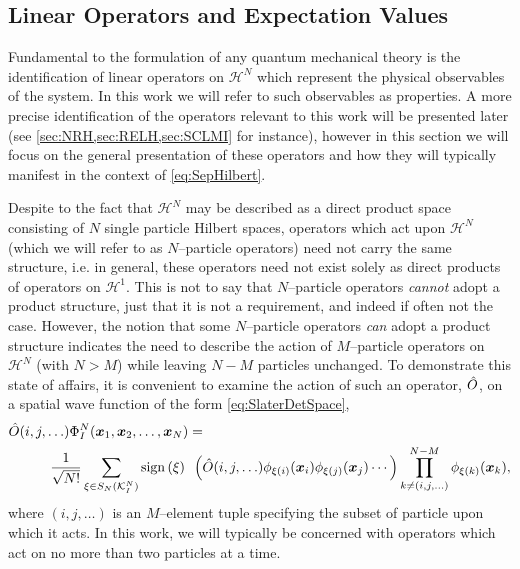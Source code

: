 \subsection{Linear Operators and Expectation Values}
\label{sec:LO}

Fundamental to the formulation of any quantum mechanical theory is the identification of linear operators on $\mathcal{H}^N$
which represent the physical observables of the system. In this work we will refer to such observables as properties. A
more precise identification of the operators relevant to this work will be presented later 
(see \cref{sec:NRH,sec:RELH,sec:SCLMI} for instance), however in this section we will focus on the general presentation
of these operators and how they will typically manifest in the context of \cref{eq:SepHilbert}. 

Despite to the fact that $\mathcal{H}^N$ may be described as a direct product space consisting of $N$ single particle
Hilbert spaces, operators which act upon $\mathcal{H}^N$ (which we will refer to as $N$--particle operators) need not carry the same structure, 
i.e. in general, these operators need not exist solely as direct products of operators on $\mathcal{H}^1$. This is not to say
that $N$--particle operators \emph{cannot} adopt a product structure, just that it is not a requirement, and indeed
if often not the case. However, the notion that some $N$--particle operators \emph{can} adopt a product structure indicates the need
to describe the action of $M$--particle operators on $\mathcal{H}^N$ (with $N>M$) while leaving $N-M$ particles unchanged.
To demonstrate this state of affairs, it is convenient to examine the action of such an operator, $\hat{O}$, on a 
spatial wave function of the form \cref{eq:SlaterDetSpace},
\begin{align}
  \label{eq:MOpSpace}
  &\hat{O}(i,j,\ldots) \Phi_I^N(\boldsymbol{x}_1,\boldsymbol{x}_2,\ldots,\boldsymbol{x}_N) = \nonumber \\ &\qquad \quad
    \frac{1}{\sqrt{N!}} \sum_{\xi \in S_N(\mathcal{K}^N_I)} \mathrm{sign}\left( \xi \right) \text{ } 
    \left(\hat{O}(i,j,\ldots) \phi_{\xi(i)}(\boldsymbol{x}_i)\phi_{\xi(j)}(\boldsymbol{x}_j)\cdots\right)
    \prod_{k \neq (i,j,\ldots) }^{N-M} \phi_{\xi(k)}(\boldsymbol{x}_k),
\end{align}
where $(i,j,\ldots)$ is an $M$--element tuple specifying the subset of particle upon which it acts.
In this work, we will typically be concerned with operators which act on no more than two particles at a time.

